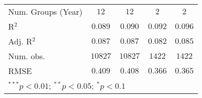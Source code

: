 \begin{table}
\begin{center}
\begin{tabular}{l c c c c}
\midrule
Num. Groups (Year)               & $12$           & $12$           & $2$            & $2$            \\
R$^2$                            & $0.089$        & $0.090$        & $0.092$        & $0.096$        \\
Adj. R$^2$                       & $0.087$        & $0.087$        & $0.082$        & $0.085$        \\
Num. obs.                        & $10827$        & $10827$        & $1422$         & $1422$         \\
RMSE                             & $0.409$        & $0.408$        & $0.366$        & $0.365$        \\
\bottomrule
\multicolumn{5}{l}{\scriptsize{$^{***}p<0.01$; $^{**}p<0.05$; $^{*}p<0.1$}}
\end{tabular}
\label{table_school_prior_shootings}
\end{center}
\end{table}
